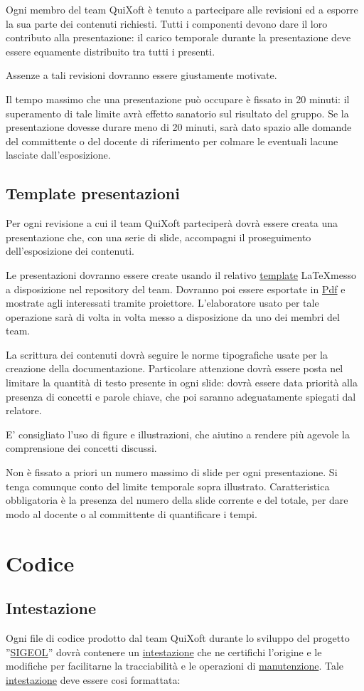 \documentclass[11pt,a4paper]{article}
\begin{document}
Ogni membro del team QuiXoft è tenuto a partecipare alle revisioni ed a esporre la sua parte dei contenuti richiesti.
Tutti i componenti devono dare il loro contributo alla presentazione: il carico temporale durante la presentazione deve essere equamente distribuito tra tutti i presenti.

Assenze a tali revisioni dovranno essere giustamente motivate.

Il tempo massimo che una presentazione può occupare è fissato in 20 minuti: il superamento di tale limite avrà effetto sanatorio sul risultato del gruppo.
Se la presentazione dovesse durare meno di 20 minuti, sarà dato spazio alle domande del committente o del docente di riferimento per colmare le eventuali lacune lasciate dall'esposizione.
\subsection{Template presentazioni}
Per ogni revisione a cui il team QuiXoft parteciperà dovrà essere creata una presentazione che, con una serie di slide, accompagni il proseguimento dell'esposizione dei contenuti.

Le presentazioni dovranno essere create usando il relativo \underline{template} \LaTeX \space messo a disposizione nel repository del team.
Dovranno poi essere esportate in \underline{Pdf} e mostrate agli interessati tramite proiettore.
L'elaboratore usato per tale operazione sarà di volta in volta messo a disposizione da uno dei membri del team.

La scrittura dei contenuti dovrà seguire le norme tipografiche usate per la creazione della documentazione.
Particolare attenzione dovrà essere posta nel limitare la quantità di testo presente in ogni slide: dovrà essere data priorità alla presenza di concetti e parole chiave, che poi saranno adeguatamente spiegati dal relatore.

E' consigliato l'uso di figure e illustrazioni, che aiutino a rendere più agevole la comprensione dei concetti discussi.

Non è fissato a priori un numero massimo di slide per ogni presentazione. Si tenga comunque conto del limite temporale sopra illustrato.
Caratteristica obbligatoria è la presenza del numero della slide corrente e del totale, per dare modo al docente o al committente di quantificare i tempi.
\section{Codice}
\subsection{Intestazione}
Ogni file di codice prodotto dal team QuiXoft durante lo sviluppo del progetto ''\underline{SIGEOL}'' dovrà contenere un \underline{intestazione} che ne certifichi l'origine e le modifiche per facilitarne la tracciabilità e le operazioni di \underline{manutenzione}.
Tale \underline{intestazione} deve essere cosi formattata: \\
\end{document}
